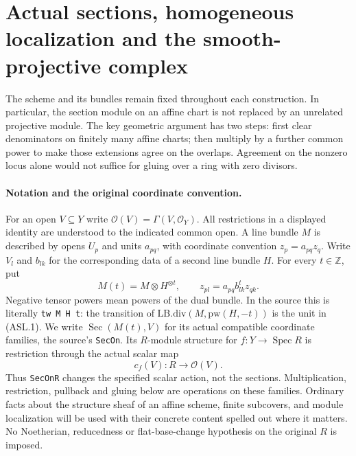 \section{Actual sections, homogeneous localization and the smooth-projective complex}
\label{sec:actual-section-localization-v054}


The scheme and its bundles remain fixed throughout each construction.
In particular, the section module on an affine chart is not replaced
by an unrelated projective module.  The key geometric argument has two
steps: first clear denominators on finitely many affine charts; then
multiply by a further common power to make those extensions agree on
the overlaps.  Agreement on the nonzero locus alone would not suffice
for gluing over a ring with zero divisors.

\paragraph{Notation and the original coordinate convention.}
For an open $V\subseteq Y$ write $\mathcal O(V)=\Gamma(V,\mathcal O_Y)$.
All restrictions in a displayed identity are understood to the indicated
common open.  A line bundle $M$ is described by opens $U_p$ and units
$a_{pq}$, with coordinate convention $z_p=a_{pq}z_q$.
Write $V_l$ and $b_{lk}$ for the corresponding data of a second
line bundle $H$.  For every $t\in\mathbb Z$, put
\[
 M(t)=M\otimes H^{\otimes t},\qquad
 z_{pl}=a_{pq}b_{lk}^{t}z_{qk}.                 \tag{ASL.1}
\]
Negative tensor powers mean powers of the dual bundle.  In the source
this is literally \texttt{tw M H t}: the transition of
$\mathrm{LB.div}(M,\mathrm{pw}(H,-t))$ is the unit in (ASL.1).
We write $\operatorname{Sec}(M(t),V)$ for its actual compatible
coordinate families, the source's \texttt{Sec\allowbreak{}On}.  Its $R$-module
structure for $f:Y\to\operatorname{Spec}R$ is restriction through
the actual scalar map
\[
 c_f(V):R\longrightarrow\mathcal O(V).
                                                        \tag{ASL.2}
\]
Thus \texttt{Sec\allowbreak{}On\allowbreak{}R} changes the specified scalar action, not the sections.
Multiplication, restriction, pullback and gluing below are operations on
these families.  Ordinary facts about the structure sheaf of an affine
scheme, finite subcovers, and module localization will be used with
their concrete content spelled out where it matters.  No Noetherian,
reducedness or flat-base-change hypothesis on the original $R$ is imposed.

